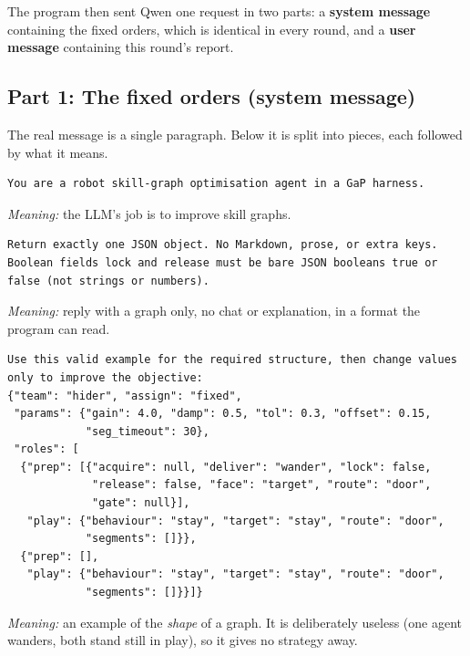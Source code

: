 \documentclass[11pt]{article}
\begin{document}
The program then sent Qwen one request in two parts: a \textbf{system message}
containing the fixed orders, which is identical in every round, and a
\textbf{user message} containing this round's report.

\subsection{Part 1: The fixed orders (system message)}

The real message is a single paragraph. Below it is split into pieces, each
followed by what it means.

{\small
\begin{verbatim}
You are a robot skill-graph optimisation agent in a GaP harness.
\end{verbatim}
}
\noindent\textit{Meaning:} the LLM's job is to improve skill graphs.

{\small
\begin{verbatim}
Return exactly one JSON object. No Markdown, prose, or extra keys.
Boolean fields lock and release must be bare JSON booleans true or
false (not strings or numbers).
\end{verbatim}
}
\noindent\textit{Meaning:} reply with a graph only, no chat or explanation, in a
format the program can read.

{\small
\begin{verbatim}
Use this valid example for the required structure, then change values
only to improve the objective:
{"team": "hider", "assign": "fixed",
 "params": {"gain": 4.0, "damp": 0.5, "tol": 0.3, "offset": 0.15,
            "seg_timeout": 30},
 "roles": [
  {"prep": [{"acquire": null, "deliver": "wander", "lock": false,
             "release": false, "face": "target", "route": "door",
             "gate": null}],
   "play": {"behaviour": "stay", "target": "stay", "route": "door",
            "segments": []}},
  {"prep": [],
   "play": {"behaviour": "stay", "target": "stay", "route": "door",
            "segments": []}}]}
\end{verbatim}
}
\noindent\textit{Meaning:} an example of the \emph{shape} of a graph. It is
deliberately useless (one agent wanders, both stand still in play), so it gives
no strategy away.
\end{document}
